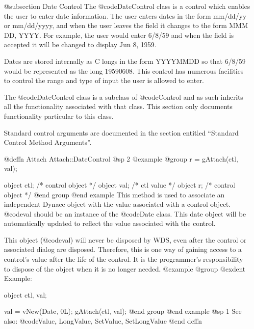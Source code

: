 @subsection Date Control
The @code{DateControl} class is a control which enables the user to
enter date information.  The user enters dates in the form mm/dd/yy
or mm/dd/yyyy, and when the user leaves the field it changes to the
form MMM DD, YYYY.  For example, the user would enter 6/8/59 and
when the field is accepted it will be changed to display Jun 8, 1959.

Dates are stored internally as C longs in the form YYYYMMDD so that
6/8/59 would be represented as the long 19590608.  This control has
numerous facilities to control the range and type of input the user is
allowed to enter.

The @code{DateControl} class is a subclass of @code{Control} and as such
inherits all the functionality associated with that class.  This section
only documents functionality particular to this class.

Standard control arguments are documented in the section entitled
``Standard Control Method Arguments''.












@deffn {Attach} Attach::DateControl
@sp 2
@example
@group
r = gAttach(ctl, val);

object  ctl;   /*  control object  */
object  val;   /*  ctl value       */
object  r;     /*  control object  */
@end group
@end example
This method is used to associate an independent Dynace object with the
value associated with a control object.  @code{val} should be an
instance of the @code{Date} class.  This date object will be
automatically updated to reflect the value associated with the control.

This object (@code{val}) will never be disposed by WDS, even after
the control or associated dialog are disposed.  Therefore, this
is one way of gaining access to a control's value after the life
of the control.  It is the programmer's responsibility to dispose of
the object when it is no longer needed.
@example
@group
@exdent Example:

object  ctl, val;

val = vNew(Date, 0L);
gAttach(ctl, val);
@end group
@end example
@sp 1
See also:  @code{Value, LongValue, SetValue, SetLongValue}
@end deffn
















